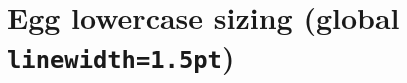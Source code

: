 \documentclass{jlreq}
\begin{document}
\section*{Egg lowercase sizing (global \texttt{linewidth=1.5pt})}

\KKSeggsuite
\KKSeggshowcase
\end{document}
